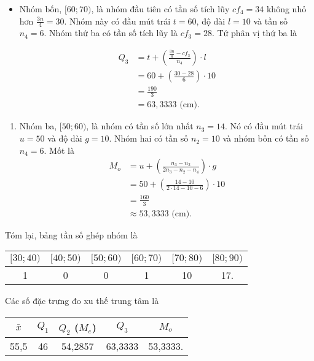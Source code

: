 \documentclass[
  letterpaper,
  DIV=11,
  numbers=noendperiod]{scrartcl}
\providecommand{\tightlist}{%
  \setlength{\itemsep}{0pt}\setlength{\parskip}{0pt}}\usepackage{longtable,booktabs,array}
\begin{document}
\begin{itemize}
\item
  Nhóm bốn, \([60;70)\), là nhóm đầu tiên có tần số tích lũy \(cf_4=34\)
  không nhỏ hơn \(\frac{3n}{4}=30\). Nhóm này có đầu mút trái \(t=60\),
  độ dài \(l=10\) và tần số \(n_4=6\). Nhóm thứ ba có tần số tích lũy là
  \(cf_3=28\). Tứ phân vị thứ ba là

  \begin{align*}
        Q_3
            & = t + \left(\frac{\frac{3n}{4}-cf_3}{n_4}\right)\cdot l \\
            & = 60 + \left(\frac{30-28}{6}\right)\cdot 10 \\
            & = \frac{190}{3} \\
            & = 63,3333 \text{ (cm).}
    \end{align*}
\end{itemize}

\begin{enumerate}
\def\labelenumi{\alph{enumi}.}
\setcounter{enumi}{1}
\tightlist
\item
  Nhóm ba, \([50;60)\), là nhóm có tần số lớn nhất \(n_3=14\). Nó có đầu
  mút trái \(u=50\) và độ dài \(g=10\). Nhóm hai có tần số \(n_2=10\) và
  nhóm bốn có tần số \(n_4=6\). Mốt là \begin{align*}
       M_o
           & = u + \left(\frac{n_3-n_2}{2n_3-n_2-n_4}\right) \cdot g \\
           & = 50 + \left(\frac{14-10}{2\cdot 14-10-6}\right)\cdot 10 \\
           & = \frac{160}{3} \\
           & \approx 53,3333 \text{ (cm)}.
   \end{align*}
\end{enumerate}

Tóm lại, bảng tần số ghép nhóm là

\begin{center}
\begin{tabular}{|c|c|c|c|c|c|}
\hline 
$[30;40)$ & $[40;50)$ & $[50;60)$ & $[60;70)$ & $[70;80)$ & $[80;90)$  \\
\hline 
1 & 0 & 0 & 1 & 10 & 17. \\
\hline
\end{tabular}
\end{center}

Các số đặc trưng đo xu thế trung tâm là

\begin{center}
\begin{tabular}{|c|c|c|c|c|}
\hline
$\bar{x}$ & $Q_1$ & $Q_2$ ($M_e$) & $Q_3$ & $M_o$ \\
\hline
55,5 & 46 & 54,2857 & 63,3333 & 53,3333. \\
\hline 
\end{tabular}
\end{center}
\end{document}
